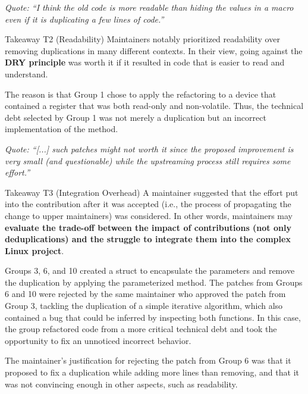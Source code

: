 \documentclass[10pt,conference]{IEEEtran}
\newenvironment{highlight-box}[1]{%
  \begin{tcolorbox}
  \textbf{#1:} \itshape}{\end{tcolorbox}}
\begin{document}
\noindent
\begin{footnotesize}
\textit{
  Quote: ``I think the old code is more readable than hiding the values in a macro
  even if it is duplicating a few lines of code.''
}
\end{footnotesize}

\begin{highlight-box}{Takeaway T2 (Readability)}
  Maintainers notably prioritized readability over removing duplications in
  many different contexts. In their view, going against the \textbf{DRY
  principle} was worth it if it resulted in code that is easier to read and
  understand.
\end{highlight-box}

The reason is that Group 1 chose to apply the refactoring to a device that contained a register that was both read-only and non-volatile. Thus, the technical debt selected by Group 1 was not merely a duplication but an incorrect implementation of the method.

\noindent
\begin{footnotesize}
\textit{
  Quote: ``[...] such patches might not worth it since the proposed
  improvement is very small (and questionable) while the upstreaming process
  still requires some effort.''
}
\end{footnotesize}

\begin{highlight-box}{Takeaway T3 (Integration Overhead)}
  A maintainer suggested that the effort put into the contribution after it was
  accepted (i.e., the process of propagating the change to upper maintainers)
  was considered. In other words, maintainers may \textbf{evaluate the
  trade-off between the impact of contributions (not only deduplications) and
  the struggle to integrate them into the complex Linux project}.
\end{highlight-box}



Groups 3, 6, and 10 created a struct to encapsulate the parameters and remove the duplication by applying the parameterized method. The patches from Groups 6 and 10 were rejected by the same maintainer who approved the patch from Group 3, tackling the duplication of a simple iterative algorithm, which also contained a bug that could be inferred by inspecting both functions. In this case, the group refactored code from a more critical technical debt and took the opportunity to fix an unnoticed incorrect behavior.

The maintainer's justification for rejecting the patch from Group 6 was that it proposed to fix a duplication while adding more lines than removing, and that it was not convincing enough in other aspects, such as readability.
\end{document}
